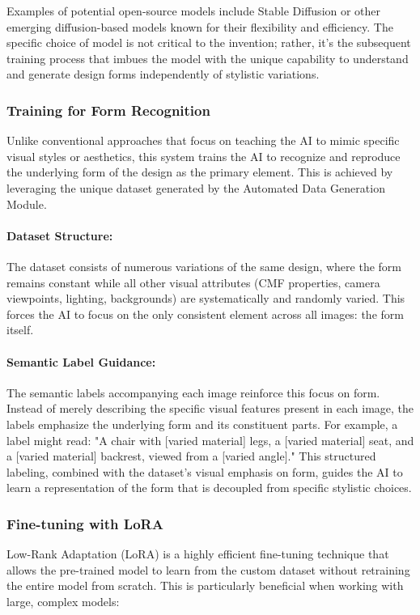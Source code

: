 \documentclass{article}
\begin{document}
Examples of potential open-source models include Stable Diffusion or other emerging diffusion-based models known for their flexibility and efficiency. The specific choice of model is not critical to the invention; rather, it's the subsequent training process that imbues the model with the unique capability to understand and generate design forms independently of stylistic variations.

\subsubsection{Training for Form Recognition}
Unlike conventional approaches that focus on teaching the AI to mimic specific visual styles or aesthetics, this system trains the AI to recognize and reproduce the underlying form of the design as the primary element. This is achieved by leveraging the unique dataset generated by the Automated Data Generation Module.

\paragraph{Dataset Structure:} The dataset consists of numerous variations of the same design, where the form remains constant while all other visual attributes (CMF properties, camera viewpoints, lighting, backgrounds) are systematically and randomly varied. This forces the AI to focus on the only consistent element across all images: the form itself.

\paragraph{Semantic Label Guidance:} The semantic labels accompanying each image reinforce this focus on form. Instead of merely describing the specific visual features present in each image, the labels emphasize the underlying form and its constituent parts. For example, a label might read: "A chair with [varied material] legs, a [varied material] seat, and a [varied material] backrest, viewed from a [varied angle]." This structured labeling, combined with the dataset's visual emphasis on form, guides the AI to learn a representation of the form that is decoupled from specific stylistic choices.

\subsubsection{Fine-tuning with LoRA}
Low-Rank Adaptation (LoRA) is a highly efficient fine-tuning technique that allows the pre-trained model to learn from the custom dataset without retraining the entire model from scratch. This is particularly beneficial when working with large, complex models:
\end{document}
